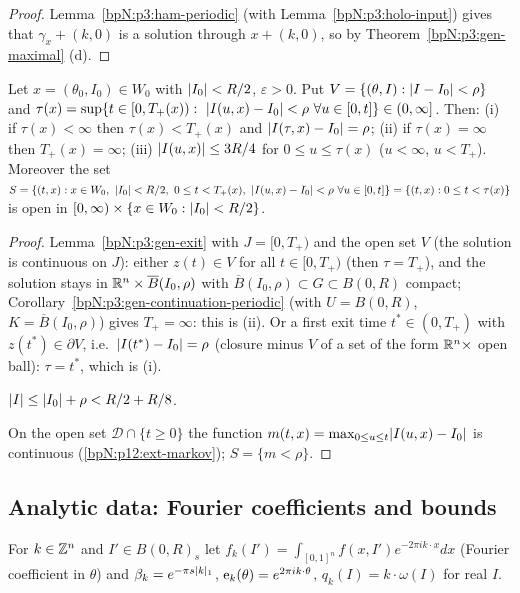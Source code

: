 \begin{proof}
\label{stepN:p12:fl-transl} Lemma~\ref{bpN:p3:ham-periodic} (with Lemma~\ref{bpN:p3:holo-input}) gives that $\gamma_x+(k,0)$ is a solution through $x+(k,0)$, so by Theorem~\ref{bpN:p3:gen-maximal} (d).
\end{proof}

\begin{lemma}\label{bpN:p12:exit}
Let $x=(\theta_0,I_0)\in W_0$ with $\lvert I_0\rvert<R/2$, $\varepsilon>0$. Put $V=\{(\theta,I):\lvert I-I_0\rvert<\rho\}$ and
$\tau(x)=\sup\{t\in[0,T_+(x)):\ \abs{I(u,x)-I_0}<\rho\ \forall u\in[0,t]\}\in(0,\infty]$.
Then: (i) if $\tau(x)<\infty$ then $\tau(x)<T_+(x)$ and $\lvert I(\tau,x)-I_0\rvert=\rho$; (ii) if $\tau(x)=\infty$ then $T_+(x)=\infty$; (iii) $\lvert I(u,x)\rvert\le3R/4$ for $0\le u\le\tau(x)$ ($u<\infty$, $u<T_+$).
Moreover the set $S=\{(t,x):x\in W_0,\ \abs{I_0}<R/2,\ 0\le t<T_+(x),\ \abs{I(u,x)-I_0}<\rho\ \forall u\in[0,t]\}=\{(t,x):0\le t<\tau(x)\}$ is open in $[0,\infty)\times\{x\in W_0:\lvert I_0\rvert<R/2\}$.
\end{lemma}
\begin{proof}
\label{stepN:p12:ex-exit} Lemma~\ref{bpN:p3:gen-exit} with $J=[0,T_+)$ and the open set $V$ (the solution is continuous on $J$): either $z(t)\in V$ for all $t\in[0,T_+)$ (then $\tau=T_+$), and the solution stays in $\mathbb{R}^n\times\overline B(I_0,\rho)$ with $\overline B(I_0,\rho)\subset G\subset B(0,R)$ compact; Corollary~\ref{bpN:p3:gen-continuation-periodic} (with $U=B(0,R)$, $K=\overline B(I_0,\rho)$) gives $T_+=\infty$: this is (ii). Or a first exit time $t^*\in(0,T_+)$ with $z(t^*)\in\partial V$, i.e.\ $\lvert I(t^*)-I_0\rvert=\rho$ (closure minus $V$ of a set of the form $\mathbb{R}^n\times$ open ball): $\tau=t^*$, which is (i).

\label{stepN:p12:ex-g} $\lvert I\rvert\le\lvert I_0\rvert+\rho<R/2+R/8$.

\label{stepN:p12:ex-open} On the open set $\mathcal D\cap\{t\ge0\}$ the function $m(t,x)=\max_{0\le u\le t}\lvert I(u,x)-I_0\rvert$ is continuous (\ref{bpN:p12:ext-markov}); $S=\{m<\rho\}$.
\end{proof}

\subsection{Analytic data: Fourier coefficients and bounds}\label{bpN:p12:s-data}

For $k\in\mathbb{Z}^n$ and $I'\in B(0,R)_s$ let $f_k(I')=\int_{[0,1]^n}f(x,I')e^{-2\pi ik\cdot x}dx$ (Fourier coefficient in $\theta$) and $\beta_k=e^{-\pi s\lvert k\rvert_1}$, $\mathrm e_{k}(\theta)=e^{2\pi ik\cdot\theta}$, $q_k(I)=k\cdot\omega(I)$ for real $I$.

